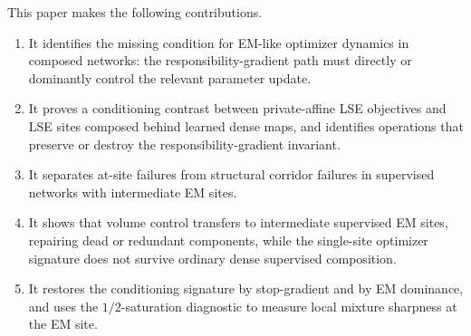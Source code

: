 This paper makes the following contributions.
\begin{enumerate}
    \item It identifies the missing condition for EM-like optimizer dynamics
    in composed networks: the responsibility-gradient path must directly or
    dominantly control the relevant parameter update.
    \item It proves a conditioning contrast between private-affine LSE
    objectives and LSE sites composed behind learned dense maps, and
    identifies operations that preserve or destroy the responsibility-gradient
    invariant.
    \item It separates at-site failures from structural corridor failures in
    supervised networks with intermediate EM sites.
    \item It shows that volume control transfers to intermediate supervised EM
    sites, repairing dead or redundant components, while the single-site
    optimizer signature does not survive ordinary dense supervised
    composition.
    \item It restores the conditioning signature by stop-gradient and by EM
    dominance, and uses the $1/2$-saturation diagnostic to measure local
    mixture sharpness at the EM site.
\end{enumerate}
